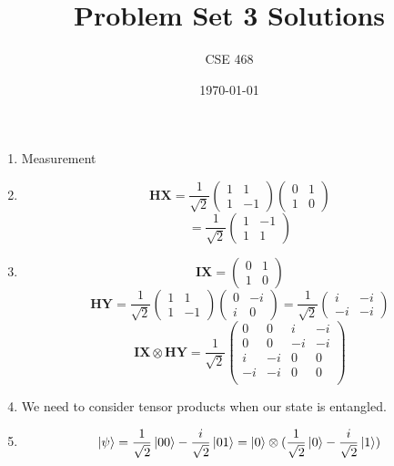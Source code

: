 \documentclass[12pt]{article}
\title{Problem Set 3 Solutions}
\author{CSE 468}
\date{\today}
\begin{document}
\maketitle

\begin{enumerate}[font=\bfseries]
    \item Measurement
    \item 
    \[
    \mathbf{HX} = \frac{1}{\sqrt{2}}\begin{pmatrix}
    1 & 1 \\ 1 & -1
    \end{pmatrix}
    \begin{pmatrix}
    0 & 1 \\ 1 & 0
    \end{pmatrix}
    \]
    \[ =\frac{1}{\sqrt{2}}\begin{pmatrix}
        1 & -1 \\
        1 & 1
        \end{pmatrix}
        \]
    \item 
    \[
    \mathbf{IX} = \begin{pmatrix}
    0 & 1 \\ 1 & 0
    \end{pmatrix}
    \]
    \[
    \mathbf{HY} = \frac{1}{\sqrt{2}}\begin{pmatrix}
    1 & 1 \\ 1 & -1
    \end{pmatrix}
    \begin{pmatrix}
    0 & -i \\ i & 0
    \end{pmatrix}
    = \frac{1}{\sqrt{2}}\begin{pmatrix}
    i & -i \\ -i & -i
    \end{pmatrix}
    \]
    \[ \mathbf{IX} \otimes \mathbf{HY} = \frac{1}{\sqrt{2}}\begin{pmatrix}
        0 & 0 & i & -i \\
        0 & 0 & -i & -i \\
        i & -i & 0 & 0 \\
        -i & -i & 0 & 0 \\
        \end{pmatrix}
        \]
    \item We need to consider tensor products when our state is entangled.
    \item \[\ket{\psi} = \frac{1}{\sqrt{2}}\ket{00} - \frac{i}{\sqrt{2}}\ket{01} = \ket{0} \otimes (\frac{1}{\sqrt{2}}\ket{0} - \frac{i}{\sqrt{2}}\ket{1})\]

\end{enumerate}
\end{document}
